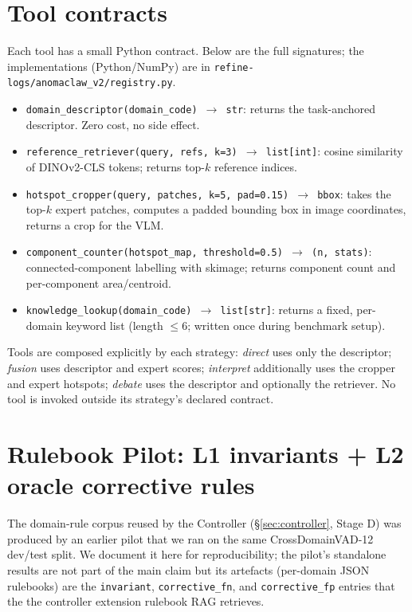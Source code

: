 \section{Tool contracts}
\label{app:tools}

Each tool has a small Python contract. Below are the full signatures; the implementations (Python/NumPy) are in \texttt{refine-logs/anomaclaw\_v2/registry.py}.

\begin{itemize}
    \item \texttt{domain\_descriptor(domain\_code) $\to$ str}: returns the task-anchored descriptor. Zero cost, no side effect.
    \item \texttt{reference\_retriever(query, refs, k=3) $\to$ list[int]}: cosine similarity of DINOv2-CLS tokens; returns top-$k$ reference indices.
    \item \texttt{hotspot\_cropper(query, patches, k=5, pad=0.15) $\to$ bbox}: takes the top-$k$ expert patches, computes a padded bounding box in image coordinates, returns a crop for the VLM.
    \item \texttt{component\_counter(hotspot\_map, threshold=0.5) $\to$ (n, stats)}: connected-component labelling with skimage; returns component count and per-component area/centroid.
    \item \texttt{knowledge\_lookup(domain\_code) $\to$ list[str]}: returns a fixed, per-domain keyword list (length $\le 6$; written once during benchmark setup).
\end{itemize}

Tools are composed explicitly by each strategy: \emph{direct} uses only the descriptor; \emph{fusion} uses descriptor and expert scores; \emph{interpret} additionally uses the cropper and expert hotspots; \emph{debate} uses the descriptor and optionally the retriever. No tool is invoked outside its strategy's declared contract.

\section{Rulebook Pilot: L1 invariants + L2 oracle corrective rules}
\label{app:rulebook_pilot}

The domain-rule corpus reused by the Controller (\S\ref{sec:controller},
Stage D) was produced by an earlier pilot that we ran on the same
CrossDomainVAD-12 dev/test split. We document it here for reproducibility;
the pilot's standalone results are not part of the main claim but its
artefacts (per-domain JSON rulebooks) are the \texttt{invariant},
\texttt{corrective\_fn}, and \texttt{corrective\_fp} entries that the  the controller extension
rulebook RAG retrieves.


